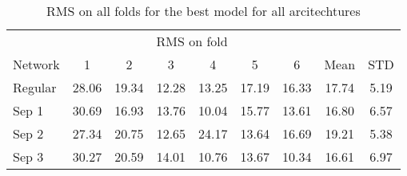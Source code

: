     
\begin{table}[h]
    \centering
    \caption{RMS on all folds for the best model for all arcitechtures}
    \begin{tabular}{lcccccccc}
        \toprule
        & \multicolumn{6}{c}{RMS on fold} & & \\
        \cmidrule(lr){2-7}
        Network & 1 & 2 & 3 & 4 & 5 & 6 & Mean & STD\\
        \midrule
        Regular & 28.06 & 19.34 & 12.28 & 13.25 & 17.19 & 16.33 & 17.74 & 5.19 \\
        Sep 1 & 30.69 & 16.93 & 13.76 & 10.04 & 15.77 & 13.61 & 16.80 & 6.57 \\
        Sep 2 & 27.34 & 20.75 & 12.65 & 24.17 & 13.64 & 16.69 & 19.21 & 5.38 \\
        Sep 3 & 30.27 & 20.59 & 14.01 & 10.76 & 13.67 & 10.34 & 16.61 & 6.97 \\
        \bottomrule
    \end{tabular}
\end{table}